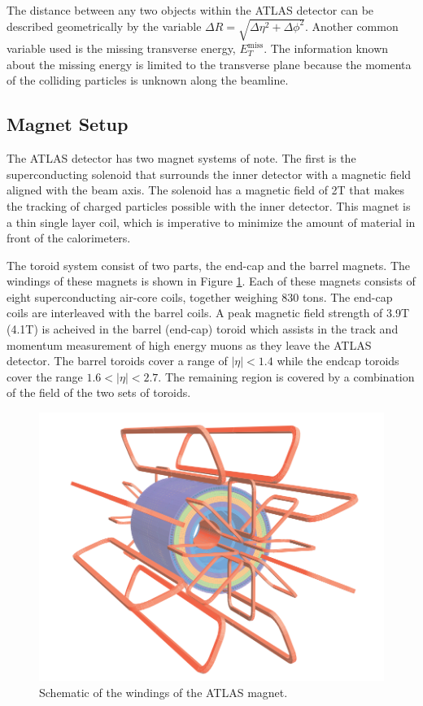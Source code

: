 The distance between any two objects within the ATLAS detector can be described geometrically by the variable $\Delta R = \sqrt{\Delta \eta^2 + \Delta \phi^2}$.  Another common variable used is the missing transverse energy, $E^{\text{miss}}_T$.  The information known about the missing energy is limited to the transverse plane because the momenta of the colliding particles is unknown along the beamline. 




\subsection{Magnet Setup}
\label{sec:ATLASMagnet}

The ATLAS detector has two magnet systems of note.  The first is the superconducting solenoid that surrounds the inner detector with a magnetic field aligned with the beam axis.  The solenoid has a magnetic field of 2T that makes the tracking of charged particles possible with the inner detector.  This magnet is a thin single layer coil, which is imperative to minimize the amount of material in front of the calorimeters. 

The toroid system consist of two parts, the end-cap and the barrel magnets.  The windings of these magnets is shown in Figure \ref{fig:ATLASMagnetWinding}.  Each of these magnets consists of eight superconducting air-core coils, together weighing 830 tons.  The end-cap coils are interleaved with the barrel coils.  A peak magnetic field strength of 3.9T (4.1T) is acheived in the barrel (end-cap) toroid which assists in the track and momentum measurement of high energy muons as they leave the ATLAS detector.  The barrel toroids cover a range of $|\eta|<1.4$ while the endcap toroids cover the range $1.6 < |\eta| <2.7$.  The remaining region is covered by a combination of the field of the two sets of toroids.
\begin{figure}[h!]
	\centering
	\includegraphics[width=0.7\columnwidth]{../ThesisImages/LHCImages/ATLASMagnetWinding.png}
	\caption[Schematic of the windings of the ATLAS magnet.]{Schematic of the windings of the ATLAS magnet.\cite{ATLAS}
	}
	\label{fig:ATLASMagnetWinding}
\end{figure}

